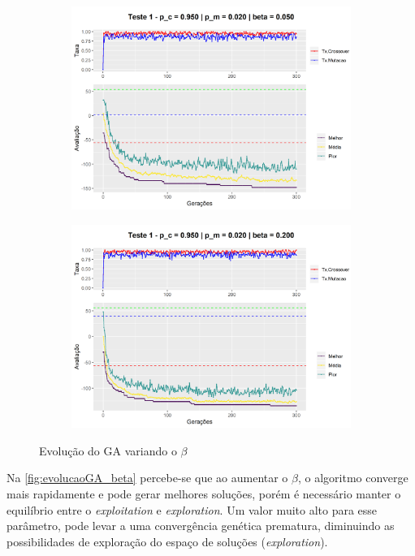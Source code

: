 \begin{figure}[h!]
\begin{subfigure}[b]{0.47\linewidth}
		\caption{}
	\end{subfigure}
	\begin{subfigure}[b]{0.47\linewidth}
		\includegraphics[width=\linewidth]{imagens/graph_pc_0_950_pm_0_020_pop_50_g_300__1_beta_0_05.png}
		\caption{}
	\end{subfigure}
	\begin{subfigure}[b]{0.47\linewidth}
		\includegraphics[width=\linewidth]{imagens/graph_pc_0_950_pm_0_020_pop_50_g_300__1_beta_0_2.png}
		\caption{}
	\end{subfigure}
	\caption{Evolução do GA variando o \(\beta\)}
	\label{fig:evolucaoGA_beta}
\end{figure}

Na \autoref{fig:evolucaoGA_beta} percebe-se que ao aumentar o \(\beta\), o algoritmo converge mais rapidamente e pode gerar melhores soluções, porém é necessário manter o equilíbrio entre o \textit{exploitation} e \textit{exploration}. Um valor muito alto para esse parâmetro, pode levar a uma convergência genética prematura, diminuindo as possibilidades de exploração do espaço de soluções (\textit{exploration}).

